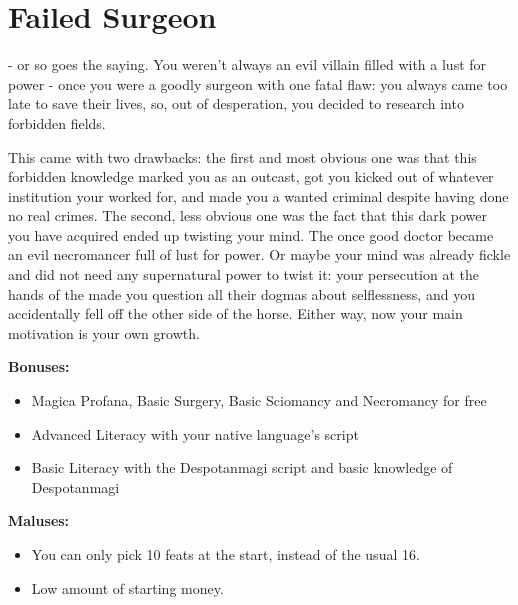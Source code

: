 \section{Failed Surgeon}
 - or so goes the saying. You weren't always an evil villain filled with a lust for power - once you were a goodly surgeon with one fatal flaw: you always came too late to save their lives, so, out of desperation, you decided to research into forbidden fields.

This came with two drawbacks: the first and most obvious one was that this forbidden knowledge marked you as an outcast, got you kicked out of whatever institution your worked for, and made you a wanted criminal despite having done no real crimes. The second, less obvious one was the fact that this dark power you have acquired ended up twisting your mind. The once good doctor became an evil necromancer full of lust for power. Or maybe your mind was already fickle and did not need any supernatural power to twist it: your persecution at the hands of the  made you question all their dogmas about selflessness, and you accidentally fell off the other side of the horse. Either way, now your main motivation is your own growth.

\textbf{Bonuses:}
\begin{itemize}
	\item Magica Profana, Basic Surgery, Basic Sciomancy and Necromancy for free
	\item Advanced Literacy with your native language's script
	\item Basic Literacy with the Despotanmagi script and basic knowledge of Despotanmagi 
\end{itemize}


\textbf{Maluses:}
\begin{itemize}
	\item You can only pick 10 feats at the start, instead of the usual 16.
	\item Low amount of starting money.
\end{itemize}
